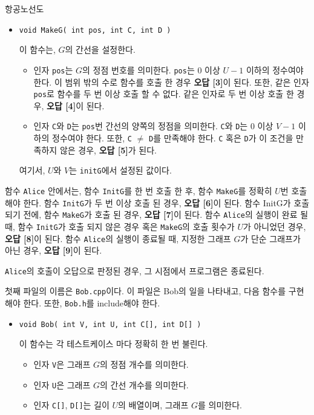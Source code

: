\begin{problem}{항공노선도}
\begin{itemize}
\begin{itemize}
	\item \texttt{void MakeG( int pos, int C, int D )}

	이 함수는, $G$의 간선을 설정한다.
	
	\begin{itemize}
		\item 인자 \texttt{pos}는 $G$의 정점 번호를 의미한다. \texttt{pos}는 0 이상 $U-1$ 이하의 정수여야 한다. 이 범위 밖의 수로 함수를 호출 한 경우 \textbf{오답 [3]}이 된다. 또한, 같은 인자 \texttt{pos}로 함수를 두 번 이상 호출 할 수 없다. 같은 인자로 두 번 이상 호출 한 경우, \textbf{오답 [4]}이 된다.
		
		\item 인자 \texttt{C}와 \texttt{D}는 \texttt{pos}번 간선의 양쪽의 정점을 의미한다. \texttt{C}와 \texttt{D}는 0 이상 $V-1$ 이하의 정수여야 한다. 또한, \texttt{C} $\ne$ \texttt{D}를 만족해야 한다. \texttt{C} 혹은 \texttt{D}가 이 조건을 만족하지 않은 경우, \textbf{오답 [5]}가 된다.
		
	\end{itemize}

	여기서, $U$와 $V$는 \texttt{initG}에서 설정된 값이다.
	 
	\end{itemize}
	
	함수 \texttt{Alice} 안에서는, 함수 \texttt{InitG}를 한 번 호출 한 후, 함수 \texttt{MakeG}를 정확히 $U$번 호출해야 한다. 함수 \texttt{InitG}가 두 번 이상 호출 된 경우, \textbf{오답 [6]}이 된다. 함수 InitG가 호출 되기 전에, 함수 \texttt{MakeG}가 호출 된 경우, \textbf{오답 [7]}이 된다. 함수 \texttt{Alice}의 실행이 완료 될 때, 함수 \texttt{InitG}가 호출 되지 않은 경우 혹은 \texttt{MakeG}의 호출 횟수가 $U$가 아니었던 경우, \textbf{오답 [8]}이 된다. 함수 \texttt{Alice}의 실행이 종료될 때, 지정한 그래프 $G$가 단순 그래프가 아닌 경우, \textbf{오답 [9]}이 된다.
	
	\texttt{Alice}의 호출이 오답으로 판정된 경우, 그 시점에서 프로그램은 종료된다.
	
\end{itemize}

첫째 파일의 이름은 \texttt{Bob.cpp}이다. 이 파일은 Bob의 일을 나타내고, 다음 함수를 구현해야 한다. 또한, \texttt{Bob.h}를 include해야 한다.

\begin{itemize}
	\item \texttt{void Bob( int V, int U, int C[], int D[] )}
	
	이 함수는 각 테스트케이스 마다 정확히 한 번 불린다.
	
	\begin{itemize}
		\item 인자 \texttt{V}은 그래프 $G$의 정점 개수를 의미한다.
		\item 인자 \texttt{U}은 그래프 $G$의 간선 개수를 의미한다.
		\item 인자 \texttt{C[]}, \texttt{D[]}는 길이 $U$의 배열이며, 그래프 $G$를 의미한다.
	\end{itemize}
	

\end{itemize}
\end{problem}
